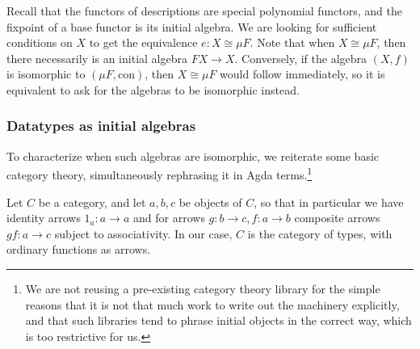 Recall that the  functors of descriptions are special polynomial functors, and the fixpoint of a base functor is its initial algebra. We are looking for sufficient conditions on $X$ to get the equivalence $e: X \cong \mu F$. Note that when $X \cong \mu F$, then there necessarily is an initial algebra $F X \to X$. Conversely, if the algebra $(X, f)$ is isomorphic to $(\mu F, \mathrm{con})$, then $X \cong \mu F$ would follow immediately, so it is equivalent to ask for the algebras to be isomorphic instead.

\begin{comment}
The situation so far is summarized by the diagram
\[\begin{tikzcd}[ampersand replacement=\&]
	\& {F\mu_F} \\
	X \& {\mu F}
	\arrow["{\mathrm{con}}", from=1-2, to=2-2]
	\arrow["e"', dashed, tail reversed, from=2-1, to=2-2]
\end{tikzcd}\]
\end{comment}
\subsubsection{Datatypes as initial algebras}
To characterize when such algebras are isomorphic, we reiterate some basic category theory, simultaneously rephrasing it in Agda terms.\footnote{We are not reusing a pre-existing category theory library for the simple reasons that it is not that much work to write out the machinery explicitly, and that such libraries tend to phrase initial objects in the correct way, which is too restrictive for us.}

Let $C$ be a category, and let $a, b, c$ be objects of $C$, so that in particular we have identity arrows $1_a : a \to a$ and for arrows $g : b \to c, f : a \to b$ composite arrows $gf : a \to c$ subject to associativity. In our case, $C$ is the category of types, with ordinary functions as arrows.

